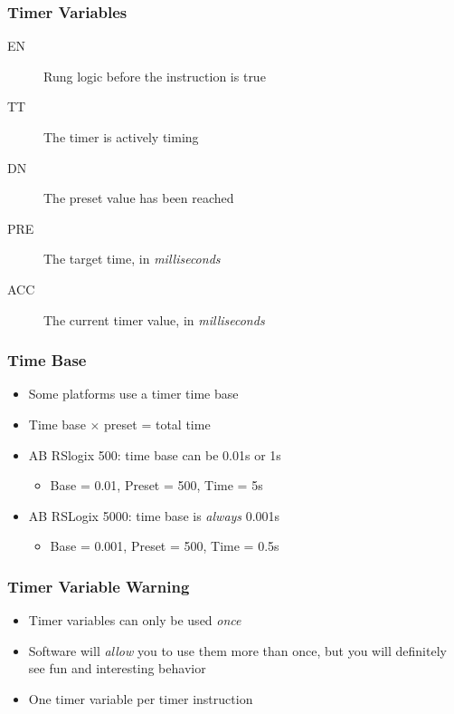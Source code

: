 \begin{frame}
    \frametitle{Timer Variables}

    \begin{description}
        \item[EN] Rung logic before the instruction is true
        \item[TT] The timer is actively timing
        \item[DN] The preset value has been reached
        \item[PRE] The target time, in \emph{milliseconds}
        \item[ACC] The current timer value, in \emph{milliseconds} 
    \end{description}
\end{frame}

\begin{frame}
    \frametitle{Time Base}

    \begin{itemize}
        \item Some platforms use a timer time base
        \item Time base $\times$ preset = total time
        \item AB RSlogix 500: time base can be 0.01s or 1s
        \begin{itemize}
            \item Base = 0.01, Preset = 500, Time = 5s
        \end{itemize}
        \item AB RSLogix 5000: time base is \emph{always} 0.001s
        \begin{itemize}
            \item Base = 0.001, Preset = 500, Time = 0.5s
        \end{itemize} 
    \end{itemize}
\end{frame}

\begin{frame}
    \frametitle{Timer Variable Warning}

    \begin{itemize}
        \item Timer variables can only be used \emph{once}
        \item Software will \emph{allow} you to use them more than once, but you will definitely see fun and interesting behavior
        \item One timer variable per timer instruction
    \end{itemize}
\end{frame}


